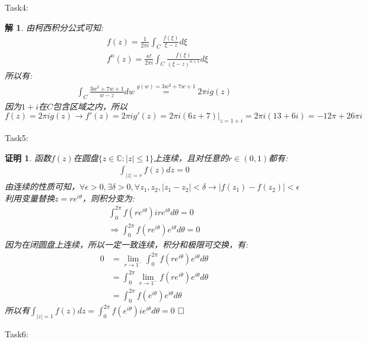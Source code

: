 \documentclass{ctexart}
\newcommand{\。}{．} %
\newenvironment{lanse}{
    \begin{tcolorbox}[breakable,enhanced, colback=qlan, boxrule=0pt, frame hidden,
        borderline west={0.7mm}{0.1mm}{slan}]
    }
    {\end{tcolorbox}}
\theoremstyle{t} %
\newtheorem*{tmhj}{\color{slan} 解}
\newtheorem*{zmhj}{\color{slan} 证明}
\newenvironment{zm}{\begin{lanse}\begin{zmhj}}{$\hfill \square$\end{zmhj}\end{lanse}}
\newenvironment{tm}{\begin{lanse}\begin{tmhj}}{\end{tmhj}\end{lanse}}
\begin{document}
Task4:
\begin{tm}
    由柯西积分公式可知:
    \begin{align*}
        &f(z)=\frac{1}{2\pi i}\int_{C}\frac{f(\xi)}{\xi-z}d\xi\\
        &f^{n}(z)=\frac{n!}{2\pi i}\int_{C}\frac{f(\xi)}{(\xi-z)^{n+1}}d\xi
    \end{align*}
    所以有:
    \begin{align*}
        \int_{C}\frac{3w^2+7w+1}{w-z}dw\overset{g(w)=3w^2+7w+1}{=}2\pi ig(z)
    \end{align*}
    因为$1+i$在$C$包含区域之内，所以$f(z)=2\pi ig(z)\rightarrow f'(z)=2\pi ig'(z)=2\pi i(6z+7)|_{z=1+i}=2\pi i(13+6i)=-12\pi+26\pi i$
\end{tm}
Task5:
\begin{zm}
    函数$f(z)$在圆盘$\{z\in\mathbb{C}:|z|\le 1\}$上连续，且对任意的$r\in (0,1)$都有:
    \begin{align*}
        \int_{|z|=r}f(z)dz=0
    \end{align*}
    由连续的性质可知，$\forall \epsilon>0,\exists \delta>0,\forall z_1,z_2, |z_1-z_2|<\delta\rightarrow |f(z_1)-f(z_2)|<\epsilon$
    利用变量替换$z=re^{i\theta}$，则积分变为:
    \begin{align*}
        \int_{0}^{2\pi}f(re^{i\theta})ire^{i\theta}d\theta=0\\
        \Rightarrow \int_{0}^{2\pi}f(re^{i\theta})e^{i\theta}d\theta=0
    \end{align*}
    因为在闭圆盘上连续，所以一定一致连续，积分和极限可交换，有:
    \begin{align*}
        0&=\lim_{r\to 1^-}\int_{0}^{2\pi}f(re^{i\theta})e^{i\theta}d\theta\\
        &=\int_{0}^{2\pi}\lim_{r\to 1^-}f(re^{i\theta})e^{i\theta}d\theta\\
        &=\int_{0}^{2\pi}f(e^{i\theta})e^{i\theta}d\theta
    \end{align*}
    所以有$\int_{|z|=1}f(z)dz=\int_{0}^{2\pi}f(e^{i\theta})ie^{i\theta}d\theta=0$
\end{zm}
Task6:
\end{document}
